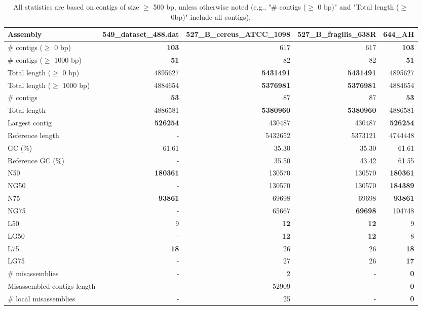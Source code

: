\documentclass[12pt,a4paper]{article}
\begin{document}
\begin{table}[ht]
\begin{center}
\caption{All statistics are based on contigs of size $\geq$ 500 bp, unless otherwise noted (e.g., "\# contigs ($\geq$ 0 bp)" and "Total length ($\geq$ 0bp)" include all contigs).}
\begin{tabular}{|l*{4}{|r}|}
\hline
Assembly & 549\_dataset\_488.dat & 527\_B\_cereus\_ATCC\_1098 & 527\_B\_fragilis\_638R & 644\_AH \\ \hline
\# contigs ($\geq$ 0 bp) & {\bf 103} & 617 & 617 & {\bf 103} \\ \hline
\# contigs ($\geq$ 1000 bp) & {\bf 51} & 82 & 82 & {\bf 51} \\ \hline
Total length ($\geq$ 0 bp) & 4895627 & {\bf 5431491} & {\bf 5431491} & 4895627 \\ \hline
Total length ($\geq$ 1000 bp) & 4884654 & {\bf 5376981} & {\bf 5376981} & 4884654 \\ \hline
\# contigs & {\bf 53} & 87 & 87 & {\bf 53} \\ \hline
Total length & 4886581 & {\bf 5380960} & {\bf 5380960} & 4886581 \\ \hline
Largest contig & {\bf 526254} & 430487 & 430487 & {\bf 526254} \\ \hline
Reference length & - & 5432652 & 5373121 & 4744448 \\ \hline
GC (\%) & 61.61 & 35.30 & 35.30 & 61.61 \\ \hline
Reference GC (\%) & - & 35.50 & 43.42 & 61.55 \\ \hline
N50 & {\bf 180361} & 130570 & 130570 & {\bf 180361} \\ \hline
NG50 & - & 130570 & 130570 & {\bf 184389} \\ \hline
N75 & {\bf 93861} & 69698 & 69698 & {\bf 93861} \\ \hline
NG75 & - & 65667 & {\bf 69698} & 104748 \\ \hline
L50 & 9 & {\bf 12} & {\bf 12} & 9 \\ \hline
LG50 & - & {\bf 12} & {\bf 12} & 8 \\ \hline
L75 & {\bf 18} & 26 & 26 & {\bf 18} \\ \hline
LG75 & - & 27 & 26 & {\bf 17} \\ \hline
\# misassemblies & - & 2 & - & {\bf 0} \\ \hline
Misassembled contigs length & - & 52909 & - & {\bf 0} \\ \hline
\# local misassemblies & - & 25 & - & {\bf 0} \\ \hline

\end{tabular}
\end{center}
\end{table}
\end{document}
